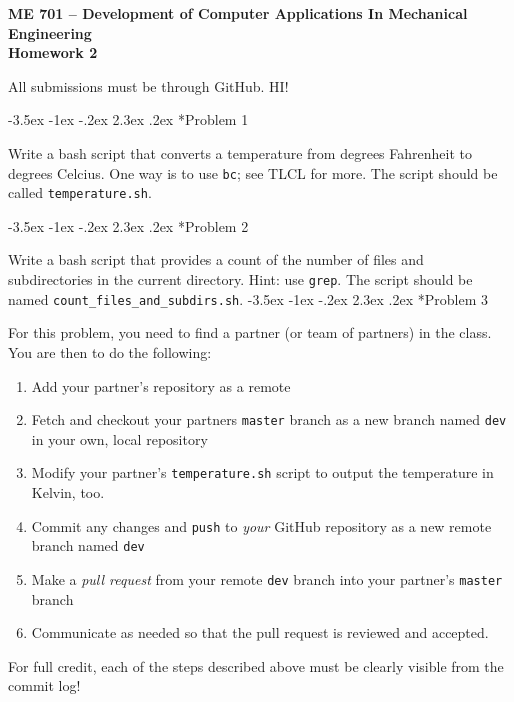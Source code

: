\documentclass[11pt]{article}
\makeatletter
\renewcommand\section{\@startsection{section}{1}{\z@}%
                                  {-3.5ex \@plus -1ex \@minus -.2ex}%
                                  {2.3ex \@plus.2ex}%
                                  {\normalfont\bfseries}}
\makeatother
\begin{document}
{\large
  \begin{center}
    {\bf ME 701 -- Development of Computer Applications In Mechanical Engineering \\ 
         Homework 2 }         
  \end{center}
}
 
All submissions must be through GitHub.
HI!

\section*{Problem 1}

Write a bash script that converts a temperature from degrees Fahrenheit to degrees Celcius. 
One way is to use {\tt bc}; see TLCL for more.  
The script should be called {\tt temperature.sh}.

\section*{Problem 2}
 
Write a bash script that provides a count of the number of files and subdirectories in the current directory. 
Hint: use {\tt grep}.
The script should be named {\tt count\_files\_and\_subdirs.sh}.
\section*{Problem 3}

For this problem, you need to find a partner (or team of partners) in the class.  
You are then to do the following:
\begin{enumerate}
 \item Add your partner's repository as a remote
 \item Fetch and checkout your partners {\tt master} branch as a new branch named {\tt dev} in your own, local repository
 \item Modify your partner's {\tt  temperature.sh} script to output the temperature in Kelvin, too.
 \item Commit any changes and {\tt push} to {\it your} GitHub repository as a new remote branch named {\tt dev}
 \item Make a {\it pull request} from your remote {\tt dev} branch into your partner's {\tt master} branch
 \item Communicate as needed so that the pull request is reviewed and accepted.
\end{enumerate}
For full credit, each of the steps described above must be clearly visible from the commit log!
\end{document}
